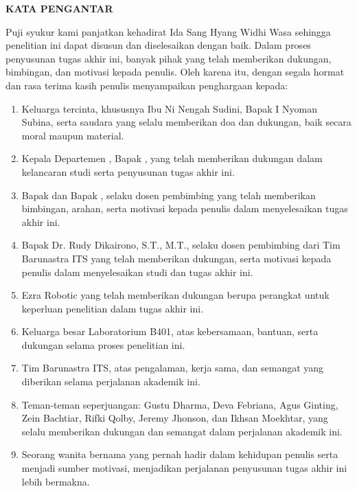 \begin{center}
  \Large
  \textbf{KATA PENGANTAR}
\end{center}


\vspace{2ex}


Puji syukur kami panjatkan kehadirat Ida Sang Hyang Widhi Wasa  sehingga penelitian ini dapat disusun dan diselesaikan dengan baik. Dalam proses penyusunan tugas akhir ini, banyak pihak yang telah memberikan dukungan, bimbingan, dan motivasi kepada penulis. Oleh karena itu, dengan segala hormat dan rasa terima kasih  penulis menyampaikan penghargaan kepada:

\begin{enumerate}[nolistsep]
  \item Keluarga tercinta, khususnya Ibu Ni Nengah Sudini, Bapak I Nyoman Subina, serta saudara yang selalu memberikan doa dan dukungan, baik secara moral maupun material.
  \item Kepala Departemen \studyprogram{}, Bapak \headofdepartment{}, yang telah memberikan dukungan dalam kelancaran studi serta penyusunan tugas akhir ini.
  \item Bapak \advisor{} dan Bapak \coadvisor{}, selaku dosen pembimbing yang telah memberikan bimbingan, arahan, serta motivasi kepada penulis dalam menyelesaikan tugas akhir ini.
  \item Bapak Dr. Rudy Dikairono, S.T., M.T., selaku dosen pembimbing dari Tim Barunastra ITS yang telah memberikan dukungan, serta motivasi kepada penulis dalam menyelesaikan studi dan tugas akhir ini.
  \item Ezra Robotic yang telah memberikan dukungan berupa perangkat untuk keperluan penelitian dalam tugas akhir ini.
  \item Keluarga besar Laboratorium B401, atas kebersamaan, bantuan, serta dukungan selama proses penelitian ini.
  \item Tim Barunastra ITS, atas pengalaman, kerja sama, dan semangat yang diberikan selama perjalanan akademik ini.
  \item Teman-teman seperjuangan: Gustu Dharma, Deva Febriana, Agus Ginting, Zein Bachtiar, Rifki Qolby, Jeremy Jhonson, dan Ikhsan Moekhtar, yang selalu memberikan dukungan dan semangat dalam perjalanan akademik ini.
  \item Seorang wanita bernama \girl{} yang pernah hadir dalam kehidupan penulis serta menjadi sumber motivasi, menjadikan perjalanan penyusunan tugas akhir ini lebih bermakna.
\end{enumerate}

